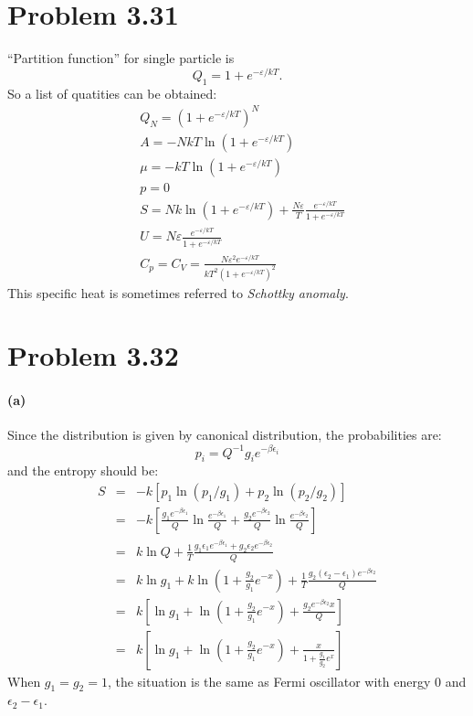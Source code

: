 \documentclass{article}
\begin{document}
\section*{Problem 3.31}
	``Partition function'' for single particle is
	\begin{equation}
	Q_{1} = 1 + e^{-\varepsilon/kT}.
	\end{equation}
	So a list of quatities can be obtained:
	\begin{align}
	&Q_{N} = (1 + e^{-\varepsilon/kT})^{N} \\
	&A = - NkT \ln (1 + e^{-\varepsilon/kT}) \\
	&\mu = - kT \ln (1 + e^{-\varepsilon/kT}) \\
	&p=0 \\
	&S = Nk \ln (1 + e^{-\varepsilon/kT}) + \frac{N \varepsilon}{T} \frac{e^{-\varepsilon/kT}}{1+e^{-\varepsilon/kT}} \\
	&U =  N \varepsilon \frac{e^{-\varepsilon/kT}}{1+e^{-\varepsilon/kT}} \\
	&C_{p} = C_{V} =  \frac{N \varepsilon^{2} e^{-\varepsilon/kT}}{kT^{2} (1+e^{-\varepsilon/kT})^{2}}
	\end{align}
	This specific heat is sometimes referred to \emph{Schottky anomaly}. 

\section*{Problem 3.32}
	\paragraph{(a)} Since the distribution is given by canonical distribution, the probabilities are:
	$$
	p_i = Q^{-1}g_ie^{-\beta \epsilon_i}
	$$
	and the entropy should be:
	\begin{eqnarray}\label{entropy}
	S &=& -k\left[p_1\ln(p_1/g_1)+p_2\ln(p_2/g_2)\right]\nonumber\\
	&=& -k\left[\frac{g_1e^{-\beta \epsilon_1}}{Q}\ln \frac{e^{-\beta\epsilon_1}}{Q}+\frac{g_2e^{-\beta \epsilon_2}}{Q}\ln \frac{e^{-\beta\epsilon_2}}{Q}\right]\nonumber\\
	&=& k\ln Q + \frac{1}{T}\frac{g_1\epsilon_1e^{-\beta\epsilon_1}+g_2\epsilon_2e^{-\beta\epsilon_2}}{Q}\nonumber\\
	&=&k\ln g_1 + k\ln\left(1+\frac{g_2}{g_1}e^{-x}\right)+\frac{1}{T}\frac{g_2(\epsilon_2-\epsilon_1)e^{-\beta\epsilon_2}}{Q}\nonumber\\
	&=&k\left[\ln g_1 + \ln\left(1+\frac{g_2}{g_1}e^{-x}\right)+\frac{g_2e^{-\beta\epsilon_2}x}{Q}\right]\nonumber\\
	&=&k\left[\ln g_1 + \ln\left(1+\frac{g_2}{g_1}e^{-x}\right)+\frac{x}{1+\frac{g_1}{g_2}e^x}\right]
	\end{eqnarray}
	When $g_1=g_2=1$, the situation is the same as Fermi oscillator with energy $0$ and $\epsilon_2-\epsilon_1$.
\end{document}
